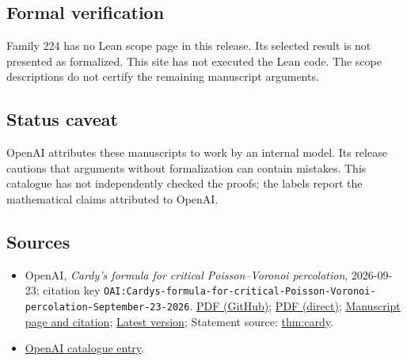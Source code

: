 \documentclass[11pt]{article}
\begin{document}
\subsection{Formal verification}
Family 224 has no Lean scope page in this release. Its selected result is not presented as formalized. This site has not executed the Lean code. The scope descriptions do not certify the remaining manuscript arguments.

\subsection{Status caveat}
OpenAI attributes these manuscripts to work by an internal model. Its release cautions that arguments without formalization can contain mistakes. This catalogue has not independently checked the proofs; the labels report the mathematical claims attributed to OpenAI.

\subsection{Sources}
\begin{itemize}
\item OpenAI, \emph{Cardy's formula for critical Poisson–Voronoi percolation}, 2026-09-23; citation key \texttt{OAI:Cardys-formula-for-critical-Poisson-Voronoi-percolation-September-23-2026}. \href{https://github.com/openai/math/blob/adc7f1241b42e322a6451854ab7e4b4c146bf78a/preprints/Cardys-formula-for-critical-Poisson-Voronoi-percolation-September-23-2026/paper.pdf}{PDF (GitHub)}; \href{https://github.com/openai/math/raw/adc7f1241b42e322a6451854ab7e4b4c146bf78a/preprints/Cardys-formula-for-critical-Poisson-Voronoi-percolation-September-23-2026/paper.pdf}{PDF (direct)}; \href{https://github.com/openai/math/blob/adc7f1241b42e322a6451854ab7e4b4c146bf78a/preprints/Cardys-formula-for-critical-Poisson-Voronoi-percolation-September-23-2026/README.md}{Manuscript page and citation}; \href{https://github.com/openai/math/blob/main/preprints/Cardys-formula-for-critical-Poisson-Voronoi-percolation-September-23-2026/paper.pdf}{Latest version}; Statement source: \href{https://github.com/openai/math/blob/adc7f1241b42e322a6451854ab7e4b4c146bf78a/preprints/Cardys-formula-for-critical-Poisson-Voronoi-percolation-September-23-2026/build/sections/00-introduction.tex\#L38}{thm:cardy}.
\item \href{https://github.com/openai/math/blob/adc7f1241b42e322a6451854ab7e4b4c146bf78a/CONTENTS.md}{OpenAI catalogue entry}.
\end{itemize}
\end{document}
